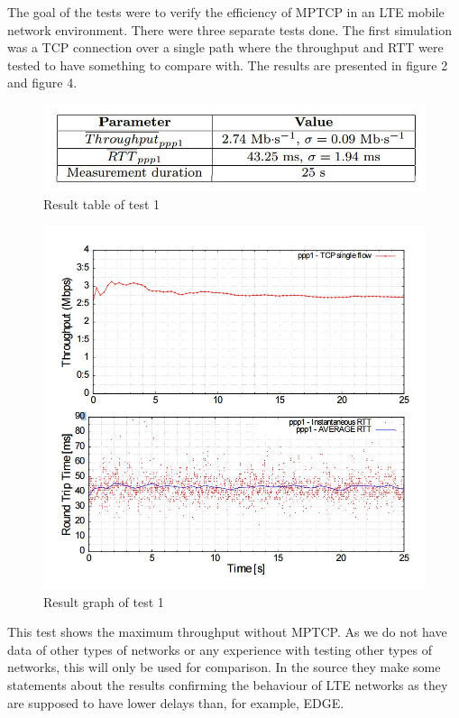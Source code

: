 \documentclass[11pt,twocolumn]{article}
\begin{document}
The goal of the tests were to verify the efficiency of MPTCP in an LTE mobile network environment. There were three separate tests done. The first simulation was a TCP connection over a single path where the throughput and RTT were tested to have something to compare with. The results are presented in figure 2 and figure 4.

\begin{figure}[ht]
\begin{center}
\includegraphics[scale=0.5]{table_1}
\caption{Result table of test 1}
\end{center}
\end{figure}
\begin{figure}[ht]
\begin{center}
\includegraphics[scale=0.5]{graph_1}
\caption{Result graph of test 1}
\end{center}
\end{figure}

This test shows the maximum throughput without MPTCP. As we do not have data of other types of networks or any experience with testing other types of networks, this will only be used for comparison. In the source they make some statements about the results confirming the behaviour of LTE networks as they are supposed to have lower delays than, for example, EDGE. 
\end{document}
